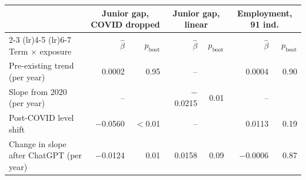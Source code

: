\begin{tabular}{lrrrrrr}
\toprule
 & \multicolumn{2}{c}{Junior gap, COVID dropped} & \multicolumn{2}{c}{Junior gap, linear} & \multicolumn{2}{c}{Employment, 91 ind.} \\
\cmidrule(lr){2-3} \cmidrule(lr){4-5} \cmidrule(lr){6-7}
Term $\times$ exposure & $\hat\beta$ & $p_{\text{boot}}$ & $\hat\beta$ & $p_{\text{boot}}$ & $\hat\beta$ & $p_{\text{boot}}$ \\
\midrule
Pre-existing trend (per year) & 0.0002 & 0.95 & -- &  & 0.0004 & 0.90 \\
Slope from 2020 (per year) & -- &  & $-$0.0215 & 0.01 & -- &  \\
Post-COVID level shift & $-$0.0560 & $<$0.01 & -- &  & 0.0113 & 0.19 \\
Change in slope after ChatGPT (per year) & $-$0.0124 & 0.01 & 0.0158 & 0.09 & $-$0.0006 & 0.87 \\
\bottomrule
\end{tabular}

